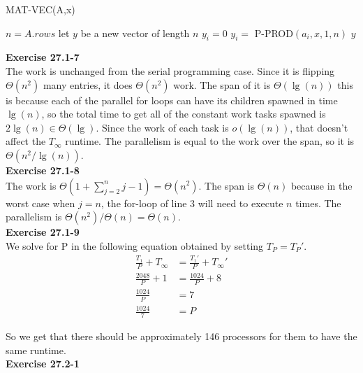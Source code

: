 \documentclass{article}
\begin{document}
\begin{algorithm}
\caption{MAT-VEC(A,x)}
\begin{algorithmic}[1]
\State $n=A.rows$
\State let $y$ be a new vector of length $n$
	\State $y_i = 0$
\EndParFor
{}
	\State $y_i = $ P-PROD$(a_i, x, 1, n)$
\EndParFor
\State \Return $y$
\end{algorithmic}
\end{algorithm}

\noindent\textbf{Exercise 27.1-7}\\

The work is unchanged from the serial programming case. Since it is flipping $\Theta(n^2)$ many entries, it does $\Theta(n^2)$ work. The span of it is $\Theta(\lg(n))$ this is because each of the parallel for loops can have its children spawned in time $\lg(n)$, so the total time to get all of the constant work tasks spawned is $2\lg(n) \in \Theta(\lg)$. Since the work of each task is $o(\lg(n))$, that doesn't affect the $T_\infty$ runtime. The parallelism is equal to the work over the span, so it is $\Theta(n^2/\lg(n))$.\\

\noindent\textbf{Exercise 27.1-8}\\

The work is $\Theta(1 + \sum_{j=2}^n j-1) = \Theta(n^2)$. The span is $\Theta(n)$ because in the worst case when $j=n$, the for-loop of line 3 will need to execute $n$ times.  The parallelism is $\Theta(n^2) / \Theta(n) = \Theta(n)$.\\

\noindent\textbf{Exercise 27.1-9}\\

We solve for P in the following equation obtained by setting $T_P = T_P'$.
\begin{align*}
\frac{T_1}{P}+T_\infty &= \frac{T_1'}{P} + T_\infty'\\
\frac{2048}{P} + 1 &= \frac{1024}{P}+8\\
\frac{1024}{P} &= 7\\
\frac{1024}{7} &=P
\end{align*}

So we get that there should be approximately 146 processors for them to have the same runtime.\\



\noindent\textbf{Exercise 27.2-1}\\
\end{document}
